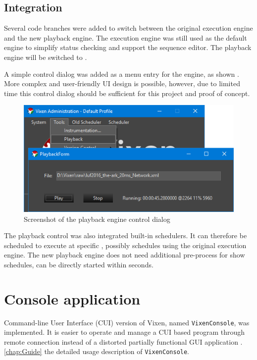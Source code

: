 \subsection{Integration}

Several code branches were added to switch between the original execution engine and the new playback engine. The execution engine was still used as the default engine to simplify status checking and support the sequence editor. The playback engine will be switched to .

A simple control dialog was added as a menu entry for the  engine, as shown  . More complex and user-friendly UI design is possible, however, due to limited time  this control dialog should be sufficient for this project and proof of concept.

\begin{figure}[t]
  \centering
  \includegraphics[width=0.8\columnwidth]{Figs/vixen_playback.png}
  \caption{\footnotesize Screenshot of the playback engine control dialog}
  \label{fig:vixen_playback}
\end{figure}

The playback control was also integrated  built-in schedulers. It can therefore be scheduled to execute at specific , possibly  schedules using the original execution engine. The new playback engine does not need additional pre-process for show schedules,  can be directly started within seconds.

\section{Console application}

 Command-line User Interface (CUI) version of Vixen, named \texttt{VixenConsole}, was implemented. It is easier to operate and manage a CUI based program through remote connection  instead of a distorted partially functional GUI application . \cref{chap:Guide}  the detailed usage description of \texttt{VixenConsole}.

